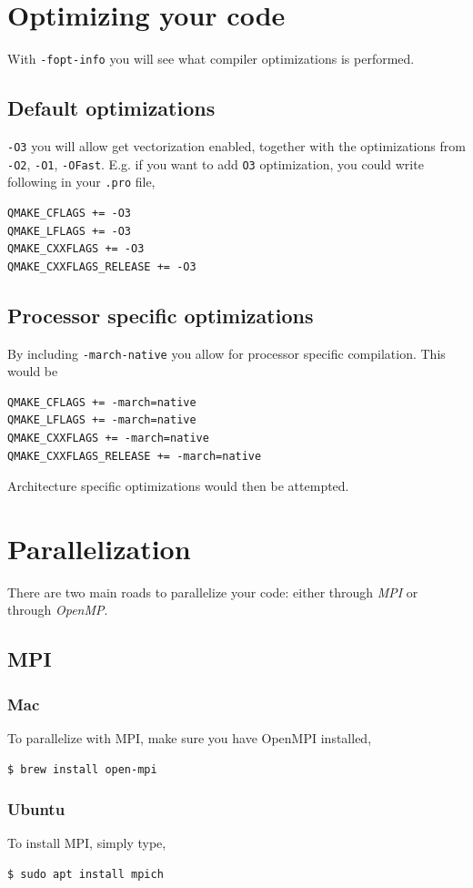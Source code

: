 \documentclass[11pt]{article}
\begin{document}
\section{Optimizing your code}
With \texttt{-fopt-info} you will see what compiler optimizations is performed.

\subsection{Default optimizations}
\texttt{-O3} you will allow get vectorization enabled, together with the optimizations from \texttt{-O2}, \texttt{-O1}, \texttt{-OFast}. E.g. if you want to add \texttt{O3} optimization, you could write following in your \texttt{.pro} file,
\begin{lstlisting}
QMAKE_CFLAGS += -O3
QMAKE_LFLAGS += -O3
QMAKE_CXXFLAGS += -O3
QMAKE_CXXFLAGS_RELEASE += -O3
\end{lstlisting}

\subsection{Processor specific optimizations}
By including \texttt{-march-native} you allow for processor specific compilation. This would be 
\begin{lstlisting}
QMAKE_CFLAGS += -march=native
QMAKE_LFLAGS += -march=native
QMAKE_CXXFLAGS += -march=native
QMAKE_CXXFLAGS_RELEASE += -march=native
\end{lstlisting}
Architecture specific optimizations would then be attempted.


\section{Parallelization}
There are two main roads to parallelize your code: either through \textit{MPI} or through \textit{OpenMP}. 
\subsection{MPI}

\subsubsection{Mac}
To parallelize with MPI, make sure you have OpenMPI installed,
\begin{lstlisting}
$ brew install open-mpi
\end{lstlisting}

\subsubsection{Ubuntu}
To install MPI, simply type,
\begin{lstlisting}
$ sudo apt install mpich
\end{lstlisting}
\end{document}

